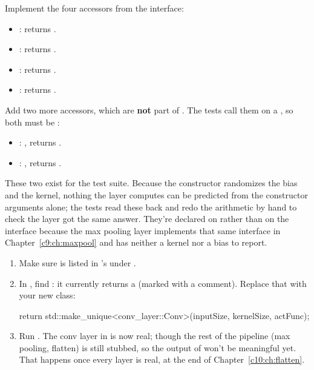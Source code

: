 \label{c8:ex:8}
Implement the four accessors from the interface:
\begin{itemize}
  \item \textbf{}: returns .
  \item \textbf{}: returns .
  \item \textbf{}: returns .
  \item \textbf{}: returns .
\end{itemize}
Add two more accessors, which are \textbf{not} part of . The tests call
them on a , so both must be :
\begin{itemize}
  \item \textbf{}: ,
    returns .
  \item \textbf{}: , returns
    .
\end{itemize}
These two exist for the test suite. Because the constructor randomizes the bias and the kernel,
nothing the layer computes can be predicted from the constructor arguments alone; the tests read
these back and redo the arithmetic by hand to check the layer got the same answer. They're declared
on  rather than on the interface because the max pooling layer implements that same
interface in Chapter~\ref{c9:ch:maxpool} and has neither a kernel nor a bias to report.

\label{c8:set:2}

\label{c8:ex:9}
\begin{enumerate}
  \item Make sure  is listed in 's
     under .
  \item In , find : it currently
    returns a  (marked with a  comment). Replace that
    with your new class:
\begin{cppcode}
return std::make_unique<conv_layer::Conv>(inputSize, kernelSize, actFunc);
\end{cppcode}
  \item Run . The conv layer in  is now real; though the rest of the
    pipeline (max pooling, flatten) is still stubbed, so the output of  won't be
    meaningful yet. That happens once every layer is real, at the end of
    Chapter~\ref{c10:ch:flatten}.
\end{enumerate}

